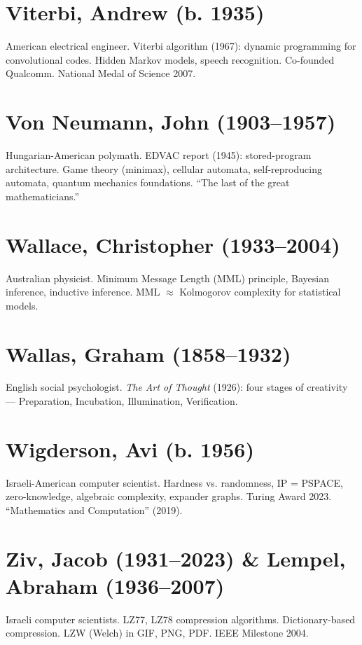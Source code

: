 \section*{Viterbi, Andrew (b. 1935)}
American electrical engineer. Viterbi algorithm (1967): dynamic programming for convolutional codes. Hidden Markov models, speech recognition. Co-founded Qualcomm. National Medal of Science 2007.

\section*{Von Neumann, John (1903--1957)}
Hungarian-American polymath. EDVAC report (1945): stored-program architecture. Game theory (minimax), cellular automata, self-reproducing automata, quantum mechanics foundations. ``The last of the great mathematicians.''

\section*{Wallace, Christopher (1933--2004)}
Australian physicist. Minimum Message Length (MML) principle, Bayesian inference, inductive inference. MML $\approx$ Kolmogorov complexity for statistical models.

\section*{Wallas, Graham (1858--1932)}
English social psychologist. \emph{The Art of Thought} (1926): four stages of creativity — Preparation, Incubation, Illumination, Verification.

\section*{Wigderson, Avi (b. 1956)}
Israeli-American computer scientist. Hardness vs. randomness, IP = PSPACE, zero-knowledge, algebraic complexity, expander graphs. Turing Award 2023. ``Mathematics and Computation'' (2019).

\section*{Ziv, Jacob (1931--2023) \& Lempel, Abraham (1936--2007)}
Israeli computer scientists. LZ77, LZ78 compression algorithms. Dictionary-based compression. LZW (Welch) in GIF, PNG, PDF. IEEE Milestone 2004.

